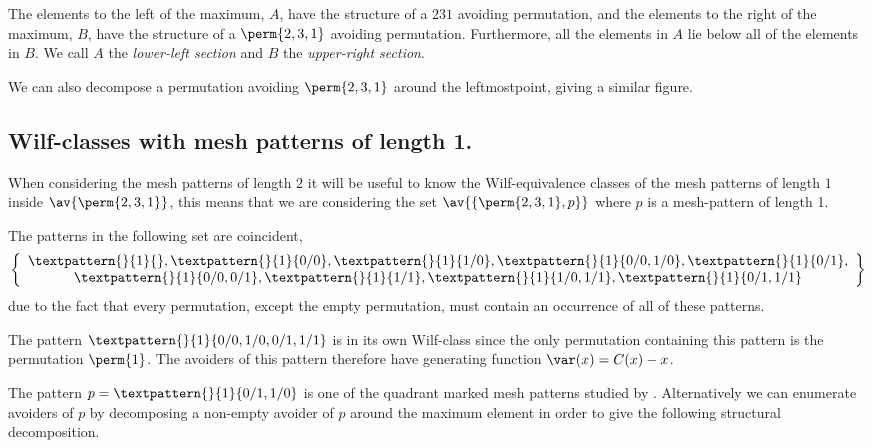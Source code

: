 The elements to the left of the maximum, \(A\), have the structure of a \(231\)
avoiding permutation, and the elements to the right of the maximum, \(B\), have
the structure of a \(\perm{2,3,1}\) avoiding permutation. Furthermore, all the
elements in \(A\) lie below all of the elements in \(B\). We call \(A\) the
\emph{lower-left section} and \(B\) the \emph{upper-right section}.

We can also decompose a permutation avoiding \(\perm{2,3,1}\) around the
leftmostpoint, giving a similar figure.

\subsection{Wilf-classes with mesh patterns of length 1.}
\label{wilf1}
When considering the mesh patterns of length \(2\) it will be useful to know
the Wilf-equivalence classes of the mesh patterns of length \(1\) inside
\(\av{\perm{2,3,1}}\), this means that we are considering the set
\(\av{\{\perm{2,3,1},p}\}\)
where \(p\) is a mesh-pattern of length 1.

The patterns in the following set are coincident,
\begin{equation*}
    \left\{
        \begin{array}{c}
        \textpattern{}{1}{},
        \textpattern{}{1}{0/0},
        \textpattern{}{1}{1/0},
        \textpattern{}{1}{0/0,1/0},
        \textpattern{}{1}{0/1},\\
        \textpattern{}{1}{0/0,0/1},
        \textpattern{}{1}{1/1},
        \textpattern{}{1}{1/0,1/1},
        \textpattern{}{1}{0/1,1/1}
    \end{array}
    \right\}
\end{equation*}
due to the fact that every permutation, except the empty
permutation, must contain an occurrence of all of these patterns.

The pattern \(\textpattern{}{1}{0/0,1/0,0/1,1/1}\) is in its own
Wilf-class since the only permutation containing this pattern is
the permutation \(\perm{1}\). The avoiders of this pattern therefore
have generating function \(\var(x) = C(x)-x\).

\nextvar
The pattern \(p = \textpattern{}{1}{0/1,1/0}\) is one of the
quadrant marked mesh patterns studied by \textcite{2012arXiv1201.6243K}.
Alternatively we can enumerate
avoiders of \(p\) by decomposing a non-empty avoider of \(p\) around the
maximum element
in order to give the following structural decomposition.

